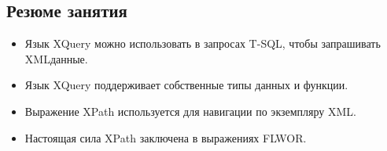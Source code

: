 \subsection*{Резюме занятия}
\begin{itemize}
	\item Язык XQuery можно использовать в запросах T-SQL, чтобы запрашивать XMLданные. 
	\item Язык XQuery поддерживает собственные типы данных и функции. 
	\item Выражение XPath используется для навигации по экземпляру XML. 
	\item Настоящая сила XPath заключена в выражениях FLWOR. 
\end{itemize}